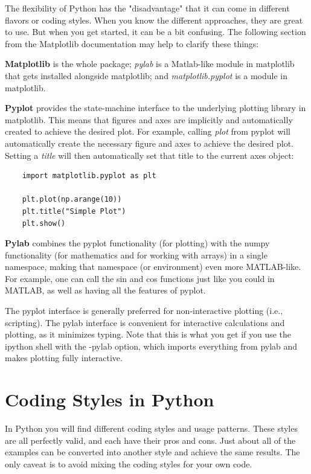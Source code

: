 The flexibility of Python has the "disadvantage" that it can come in different flavors or coding styles. When you know the different approaches, they are great to use. But when you get started, it can be a bit confusing. The following section from the Matplotlib documentation may help to clarify
these things:

\textbf{Matplotlib} is the whole package; \emph{pylab} is a Matlab-like module in matplotlib that gets installed alongside matplotlib; and \emph{matplotlib.pyplot} is a module in matplotlib.

\textbf{Pyplot} provides the state-machine interface to the underlying plotting library in matplotlib. This means that figures and axes are implicitly and automatically created to achieve the desired plot. For example, calling \emph{plot }from pyplot will automatically create the necessary figure and axes to achieve the desired plot. Setting a \emph{title }will then automatically set that title to the current axes object:

\begin{lstlisting}
    import matplotlib.pyplot as plt

    plt.plot(np.arange(10))
    plt.title("Simple Plot")
    plt.show()
\end{lstlisting}

\textbf{Pylab} combines the pyplot functionality (for plotting) with the numpy functionality (for mathematics and for working with arrays) in a single namespace, making that namespace (or environment) even more MATLAB-like. For example, one can call the sin and cos functions just like you could in MATLAB, as well as having all the features of pyplot.

The pyplot interface is generally preferred for non-interactive plotting (i.e., scripting). The pylab interface is convenient for interactive calculations and plotting, as it minimizes typing. Note that this is what you get if you use the ipython shell with the -pylab option, which imports everything from pylab and makes plotting fully interactive.

\section{Coding Styles in Python}

In Python you will find different coding styles and usage patterns. These styles are all perfectly valid, and each have their pros and cons. Just about all of the examples can be converted into another style and achieve the same results. The only caveat is to avoid mixing the coding styles for your own code.


